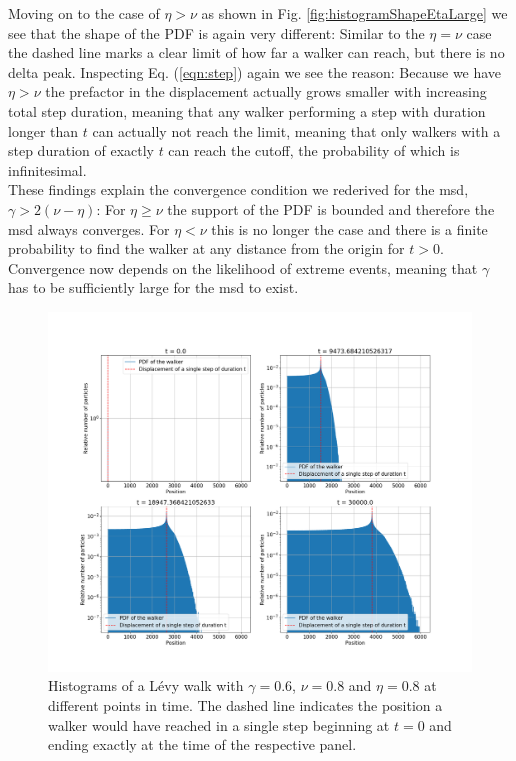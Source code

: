 Moving on to the case of $\eta> \nu$ as shown in Fig. \ref{fig:histogramShapeEtaLarge} we see that the shape of the \gls{PDF} is again very different: Similar to the $\eta = \nu$ case the dashed line marks a clear limit of how far a walker can reach, but there is no delta peak. Inspecting Eq. (\ref{eqn:step}) again we see the reason: Because we have $\eta> \nu$ the prefactor in the displacement actually grows smaller with increasing total step duration, meaning that any walker performing a step with duration longer than $t$ can actually not reach the limit, meaning that only walkers with a step duration of exactly $t$ can reach the cutoff, the probability of which is infinitesimal. \\

These findings explain the convergence condition we rederived for the \gls{msd}, $\gamma > 2(\nu-\eta)$: For $\eta \geq \nu$ the support of the \gls{PDF} is bounded and therefore the \gls{msd} always converges. For $\eta < \nu$ this is no longer the case and there is a finite probability to find the walker at any distance from the origin for $t>0$. Convergence now depends on the likelihood of extreme events, meaning that $\gamma$ has to be sufficiently large for the \gls{msd} to exist.\\
%
\begin{figure}[!htb] %
\begin{center}
\includegraphics[width=1\textwidth]{pics/histogramShapeNuSmall.png}
\caption{Histograms of a L\'evy walk with $\gamma =0.6$, $\nu = 0.8$ and $\eta =0.8$ at different points in time. The dashed line indicates the position a walker would have reached in a single step beginning at $t=0$ and ending exactly at the time of the respective panel.
\label{fig:histogramShapeNuSmall} }
\end{center}
\end{figure} 

